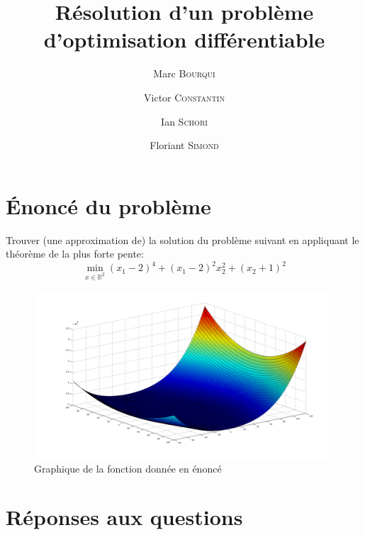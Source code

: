 \documentclass[11pt,a4paper,twoside,onecolumn,titlepage]{report}
\title{Résolution d'un problème d'optimisation différentiable}
\author{Marc \textsc{Bourqui} \and Victor \textsc{Constantin} \and Ian \textsc{Schori} \and Floriant \textsc{Simond}}
\begin{document}


\section*{Énoncé du problème}

Trouver (une approximation de) la solution du problème suivant en appliquant le théorème de la plus forte pente:
\begin{equation}
\min_{x\in\mathbb{R}^2} (x_1-2)^4 + (x_1-2)^2x_2^2 + (x_2+1)^2
\end{equation}


\begin{figure}[h!]
	\centering
	\includegraphics[scale=0.3]{f}
	\caption{Graphique de la fonction donnée en énoncé}
	\label{plot:f}
\end{figure}



\section*{Réponses aux questions}
\end{document}
